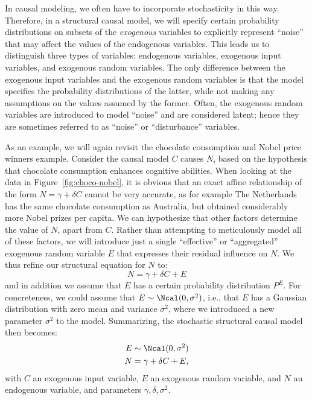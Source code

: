 In causal modeling, we often have to 
incorporate stochasticity in this way. Therefore, in a structural causal model,
we will specify certain probability distributions on subsets of the \emph{exogenous}
variables to explicitly represent ``noise'' that may affect the values of the
endogenous variables. This leads us to distinguish three types of variables:
endogenous variables, exogenous input variables, and exogenous random variables.
The only difference between the exogenous input variables and the exogenous
random variables is that the model specifies the probability distributions of the
latter, while not making any assumptions on the values assumed by the former.
Often, the exogenous random variables are introduced to model ``noise'' and 
are considered latent; hence they are sometimes referred to as ``noise'' or
``disturbance'' variables.

As an example, we will again revisit the chocolate consumption and Nobel price
winners example. Consider the causal model $C$ causes $N$, based on the hypothesis
that chocolate consumption enhances cognitive abilities. When looking at the data
in Figure~\ref{fig:choco-nobel}, it is obvious that an exact affine relationship
of the form $N = \gamma + \delta C$ cannot be very accurate, as for example
The Netherlands has the same chocolate consumption as Australia, but obtained 
considerably more Nobel prizes per capita. We can hypothesize that 
other factors determine the value of $N$, apart from $C$. Rather than attempting to meticulously
model all of these factors, we will introduce just a single ``effective'' or 
``aggregated'' exogenous random
variable $E$ that expresses their residual influence on $N$. We thus refine our
structural equation for $N$ to:
  \begin{equation}\label{eq:se_C_causes_N_noisy}
  N = \gamma + \delta C + E
  \end{equation}
and in addition we assume that $E$ has a certain probability distribution $P^E$.
For concreteness, we could assume that $E \sim \Ncal(0,\sigma^2)$, i.e., that $E$
has a Gaussian distribution with zero mean and variance $\sigma^2$, where we 
introduced a new parameter $\sigma^2$ to the model. Summarizing, the stochastic
structural causal model then becomes:
  \begin{align*}\label{eq:scm_C_causes_N_noisy}
      E \sim {} & \Ncal(0,\sigma^2) \\
      N = {} & \gamma + \delta C + E,
  \end{align*}
with $C$ an exogenous input variable, $E$ an exogenous random variable,
and $N$ an endogenous variable, and parameters $\gamma,\delta,\sigma^2$.

